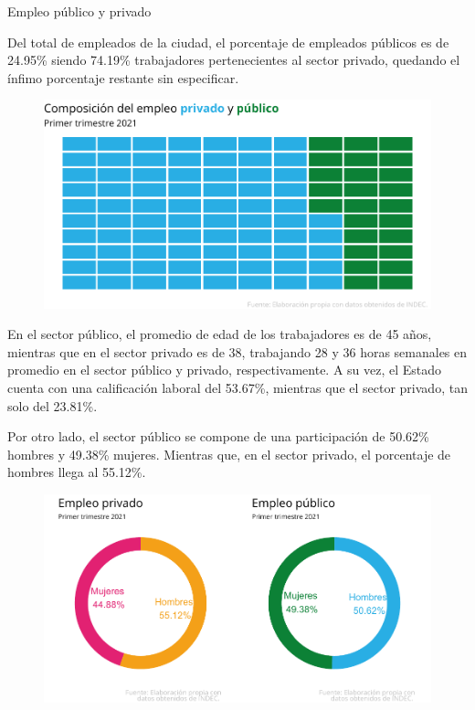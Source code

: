 \documentclass{article}
\begin{document}
\newpage

\textcolor{graycustom}{\Large Empleo público y privado} \newline

Del total de empleados de la ciudad, el porcentaje de empleados públicos
es de 24.95\% siendo 74.19\% trabajadores pertenecientes al sector
privado, quedando el ínfimo porcentaje restante sin especificar.


\begin{figure}[hbp!]
\includegraphics{Informe-Mercado-Laboral_files/figure-latex/unnamed-chunk-25-1.pdf}
\caption{}
\end{figure}


En el sector público, el promedio de edad de los trabajadores es de 45
años, mientras que en el sector privado es de 38, trabajando 28 y 36
horas semanales en promedio en el sector público y privado,
respectivamente. A su vez, el Estado cuenta con una calificación laboral
del 53.67\%, mientras que el sector privado, tan solo del 23.81\%.

Por otro lado, el sector público se compone de una participación de
50.62\% hombres y 49.38\% mujeres. Mientras que, en el sector privado,
el porcentaje de hombres llega al 55.12\%.


\newpage
\begin{figure}
\includegraphics{Informe-Mercado-Laboral_files/figure-latex/unnamed-chunk-31-1.pdf}\caption{} 
\end{figure}
\end{document}
